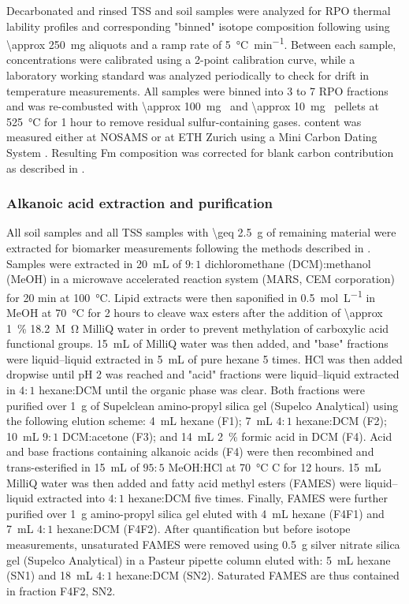 Decarbonated and rinsed TSS and soil samples were analyzed for RPO thermal lability profiles and corresponding "binned" isotope composition following \citet{Hemingway:2016rc} using \SI{\approx 250}{mg} aliquots and a ramp rate of \SI{5}{\celsius.min^{-1}}. Between each sample,  concentrations were calibrated using a 2-point calibration curve, while a laboratory working standard was analyzed periodically to check for drift in temperature measurements. All samples were binned into 3 to 7 RPO fractions and  was re-combusted with \SI{\approx 100}{mg.} and \SI{\approx 10}{mg.} pellets at \SI{525}{\celsius} for 1 hour to remove residual sulfur-containing gases.   content was measured either at NOSAMS or at ETH Zurich using a Mini Carbon Dating System \citep[Micadas;][]{McNichol:1994ty,Christl:2013ks}. Resulting Fm composition was corrected for blank carbon contribution as described in \citet{Hemingway:2016rc}.

\subsubsection{Alkanoic acid extraction and purification}

All soil samples and all TSS samples with \SI{\geq 2.5}{g} of remaining material were extracted for biomarker measurements following the methods described in \citet{Hemingway:2016bq}. Samples were extracted in \SI{20}{mL} of $9:1$ dichloromethane (DCM):methanol (MeOH) in a microwave accelerated reaction system (MARS, CEM corporation) for 20 min at \SI{100}{\celsius}. Lipid extracts were then saponified in \SI{0.5}{mol.L^{-1}}  in MeOH at \SI{70}{\celsius} for 2 hours to cleave wax esters after the addition of \SI{\approx 1}{\%} \SI{18.2}{M \ohm} MilliQ water in order to prevent methylation of carboxylic acid functional groups. \SI{15}{mL} of MilliQ water was then added, and "base" fractions were liquid--liquid extracted in \SI{5}{mL} of pure hexane 5 times. HCl was then added dropwise until pH 2 was reached and "acid" fractions were liquid--liquid extracted in $4:1$ hexane:DCM until the organic phase was clear. Both fractions were purified over \SI{1}{g} of Supelclean amino-propyl silica gel (Supelco Analytical) using the following elution scheme: \SI{4}{mL} hexane (F1); \SI{7}{mL} $4:1$ hexane:DCM (F2); \SI{10}{mL} $9:1$ DCM:acetone (F3); and \SI{14}{mL} \SI{2}{\%} formic acid in DCM (F4). Acid and base fractions containing alkanoic acids (F4) were then recombined and trans-esterified in \SI{15}{mL} of $95:5$ MeOH:HCl at \SI{70}{\celsius} C for 12 hours. \SI{15}{mL} MilliQ water was then added and fatty acid methyl esters (FAMES) were liquid--liquid extracted into $4:1$ hexane:DCM five times. Finally, FAMES were further purified over \SI{1}{g} amino-propyl silica gel eluted with \SI{4}{mL} hexane (F4F1) and \SI{7}{mL} $4:1$ hexane:DCM (F4F2). After quantification but before isotope measurements, unsaturated FAMES were removed using \SI{0.5}{g} silver nitrate silica gel (Supelco Analytical) in a Pasteur pipette column eluted with: \SI{5}{mL} hexane (SN1) and \SI{18}{mL} $4:1$ hexane:DCM (SN2). Saturated FAMES are thus contained in fraction F4F2, SN2.

